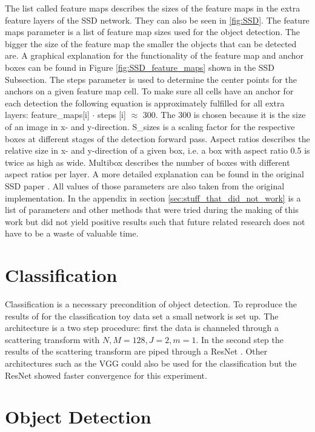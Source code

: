 The list called feature maps describes the sizes of the feature maps in the extra feature layers of the SSD network. They can also be seen in \ref{fig:SSD}. 
The feature maps parameter is a list of feature map sizes used for the object detection. The bigger the size of the feature map the smaller the objects that can be detected are. A graphical explanation for the functionality of the feature map and anchor boxes can be found in Figure \ref{fig:SSD_feature_maps} shown in the SSD Subsection.
The steps parameter is used to determine the center points for the anchors on a given feature map cell. To make sure all cells have an anchor for each detection the following equation is approximately fulfilled for all extra layers: feature\_maps[i] $\cdot$ steps [i] $\approx$ 300. The 300 is chosen because it is the size of an image in x- and y-direction. S\_sizes is a scaling factor for the respective boxes at different stages of the detection forward pass. Aspect ratios describes the relative size in x- and y-direction of a given box, i.e. a box with aspect ratio 0.5 is twice as high as wide. Multibox describes the number of boxes with different aspect ratios per layer. A more detailed explanation can be found in the original SSD paper \cite{SSD}. All values of those parameters are also taken from the original implementation. In the appendix in section \ref{sec:stuff_that_did_not_work} is a list of parameters and other methods that were tried during the making of this work but did not yield positive results such that future related research does not have to be a waste of valuable time. 


\section{Classification}
\label{sec:classification_experiments}

Classification is a necessary precondition of object detection. To reproduce the results of \cite{ScalingTheScatteringTransform2017} for the classification toy data set a small network is set up. The architecture is a two step procedure: first the data is channeled through a scattering transform with $N,M=128, J=2, m=1$. In the second step the results of the scattering transform are piped through a ResNet \cite{ResNet15}. Other architectures such as the VGG could also be used for the classification but the ResNet showed faster convergence for this experiment. 

\section{Object Detection}
\label{sec:object_detection_experiments}

